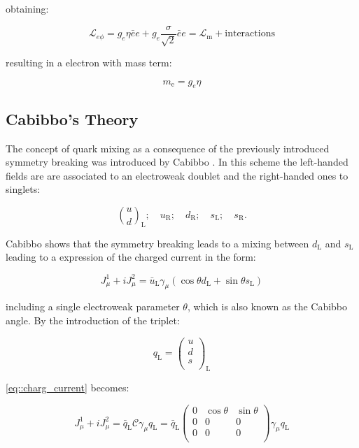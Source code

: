obtaining:

\begin{equation}
\mathcal{L}_{e\phi} = g_{e}\eta\bar{e}e + g_{e} \dfrac{\sigma}{\sqrt{2}}\bar{e}e = \mathcal{L}_{\text{m}} + \text{interactions}
\end{equation}

resulting in a electron with mass term:

\begin{equation}
m_{\text{e}} = g_{e}\eta
\end{equation}

\subsection{Cabibbo's Theory}

The concept of quark mixing as a consequence of the previously introduced symmetry breaking was introduced by Cabibbo \cite{PhysRevLett.10.531}. In this scheme the left-handed fields are are associated to an electroweak doublet and the right-handed ones to singlets:

\begin{equation}
\binom{u}{d}_{\text{L}}; \quad u_{\text{R}}; \quad d_{\text{R}}; \quad s_{\text{L}}; \quad s_{\text{R}}.
\end{equation}

Cabibbo shows that the symmetry breaking leads to a mixing between $d_{\text{L}}$ and $s_{\text{L}}$ leading to a expression of the charged current in the form:

\begin{equation}
J^{1}_{\mu} + i J^{2}_{\mu}= \bar{u}_{\text{L}}\gamma_{\mu} (\cos\theta d_{\text{L}} +\sin\theta s_{\text{L}})
\label{eq::charg_current}
\end{equation}

including a single electroweak parameter $\theta$, which is also known as the Cabibbo angle. By the introduction of the triplet:

\begin{equation}
q_{\text{L}} = 
\begin{pmatrix}
u \\
d \\
s \\
\end{pmatrix}
_{\text{L}}
\end{equation}

\autoref{eq::charg_current} becomes:

\begin{equation}
J^{1}_{\mu} + i J^{2}_{\mu} = \bar{q}_{\text{L}}\mathcal{C}\gamma_{\mu}q_{\text{L}} =  \bar{q}_{\text{L}}
\begin{pmatrix}
0 &\cos\theta &\sin\theta \\
0 &0 &0 \\
0 &0 &0\\
\end{pmatrix}
\gamma_{\mu}q_{\text{L}}
\label{eq::charg_current_matrix}
\end{equation}

